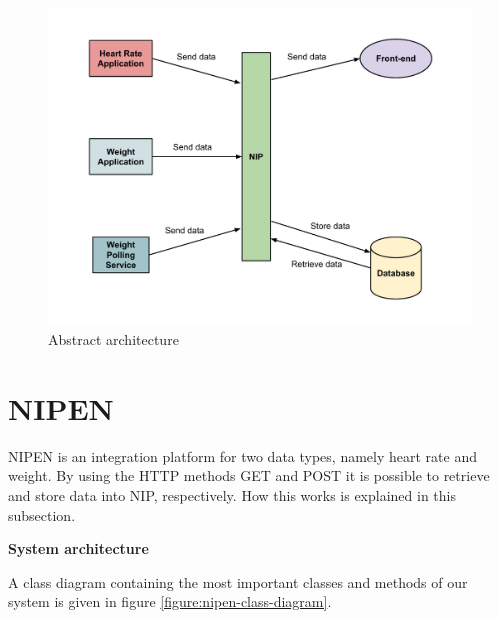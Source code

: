 \begin{figure}[h]
\centering
\includegraphics[scale=0.5]{../Figures/abstract-architecture.pdf}
\caption{Abstract architecture}
\label{figure:abstract-architecture}
\end{figure}

\section{NIPEN}

NIPEN is an integration platform for two data types, namely heart rate and weight.
By using the HTTP methods GET and POST it is possible to retrieve and store data into NIP, respectively.
How this works is explained in this subsection.

\textbf{System architecture}

A class diagram containing the most important classes and methods of our system is given in figure \ref{figure:nipen-class-diagram}.

